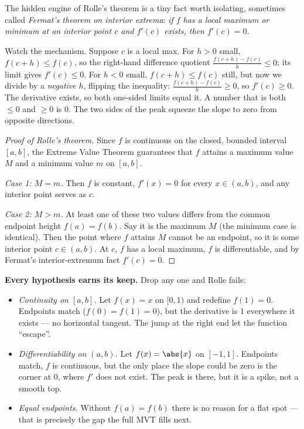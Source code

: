 \begin{whybox}
The hidden engine of Rolle's theorem is a tiny fact worth isolating, sometimes
called \emph{Fermat's theorem on interior extrema}: \textit{if $f$ has a local
maximum or minimum at an interior point $c$ and $f'(c)$ exists, then $f'(c)=0$.}

Watch the mechanism. Suppose $c$ is a local max. For $h>0$ small, $f(c+h)\le f(c)$,
so the right-hand difference quotient $\frac{f(c+h)-f(c)}{h}\le 0$; its limit gives
$f'(c)\le 0$. For $h<0$ small, $f(c+h)\le f(c)$ still, but now we divide by a
\emph{negative} $h$, flipping the inequality: $\frac{f(c+h)-f(c)}{h}\ge 0$, so
$f'(c)\ge 0$. The derivative exists, so both one-sided limits equal it. A number
that is both $\le 0$ and $\ge 0$ is $0$. The two sides of the peak squeeze the
slope to zero from opposite directions.
\end{whybox}

\begin{proof}[Proof of Rolle's theorem]
Since $f$ is continuous on the closed, bounded interval $[a,b]$, the Extreme Value
Theorem guarantees that $f$ attains a maximum value $M$ and a minimum value $m$ on
$[a,b]$.

\emph{Case 1: $M=m$.} Then $f$ is constant, $f'(x)=0$ for every $x\in(a,b)$, and any
interior point serves as $c$.

\emph{Case 2: $M>m$.} At least one of these two values differs from the common
endpoint height $f(a)=f(b)$. Say it is the maximum $M$ (the minimum case is
identical). Then the point where $f$ attains $M$ cannot be an endpoint, so it is
some interior point $c\in(a,b)$. At $c$, $f$ has a local maximum, $f$ is
differentiable, and by Fermat's interior-extremum fact $f'(c)=0$.
\end{proof}

\begin{trapbox}
\textbf{Every hypothesis earns its keep.} Drop any one and Rolle fails:
\begin{itemize}
\item \emph{Continuity on $[a,b]$.} Let $f(x)=x$ on $[0,1)$ and redefine $f(1)=0$.
Endpoints match ($f(0)=f(1)=0$), but the derivative is $1$ everywhere it exists ---
no horizontal tangent. The jump at the right end let the function ``escape''.
\item \emph{Differentiability on $(a,b)$.} Let $f(x)=\abs{x}$ on $[-1,1]$. Endpoints
match, $f$ is continuous, but the only place the slope could be zero is the corner
at $0$, where $f'$ does not exist. The peak is there, but it is a spike, not a
smooth top.
\item \emph{Equal endpoints.} Without $f(a)=f(b)$ there is no reason for a flat
spot --- that is precisely the gap the full MVT fills next.
\end{itemize}
\end{trapbox}

